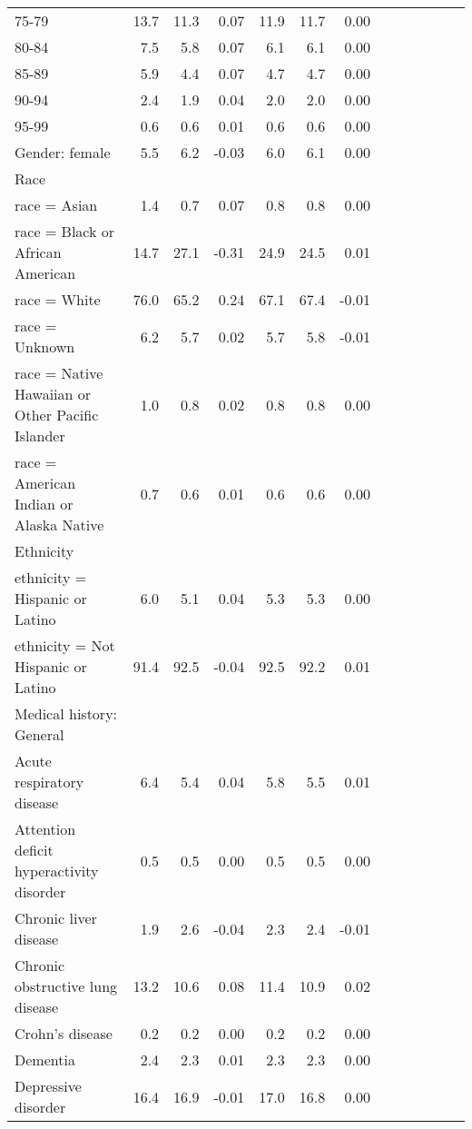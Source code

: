 \documentclass[11pt,]{article}
\begin{document}
\begin{longtable}{lrrrrrrrrrrrr}
      75-79 & 13.7 & 11.3 &  0.07 & 11.9 & 11.7 &  0.00 \\ 
      80-84 &  7.5 &  5.8 &  0.07 &  6.1 &  6.1 &  0.00 \\ 
      85-89 &  5.9 &  4.4 &  0.07 &  4.7 &  4.7 &  0.00 \\ 
      90-94 &  2.4 &  1.9 &  0.04 &  2.0 &  2.0 &  0.00 \\ 
      95-99 &  0.6 &  0.6 &  0.01 &  0.6 &  0.6 &  0.00 \\ 
  Gender: female &  5.5 &  6.2 & -0.03 &  6.0 &  6.1 &  0.00 \\ 
  Race &    &    &     &    &    &     \\ 
      race = Asian &  1.4 &  0.7 &  0.07 &  0.8 &  0.8 &  0.00 \\ 
      race = Black or African American & 14.7 & 27.1 & -0.31 & 24.9 & 24.5 &  0.01 \\ 
      race = White & 76.0 & 65.2 &  0.24 & 67.1 & 67.4 & -0.01 \\ 
      race = Unknown &  6.2 &  5.7 &  0.02 &  5.7 &  5.8 & -0.01 \\ 
      race = Native Hawaiian or Other Pacific Islander &  1.0 &  0.8 &  0.02 &  0.8 &  0.8 &  0.00 \\ 
      race = American Indian or Alaska Native &  0.7 &  0.6 &  0.01 &  0.6 &  0.6 &  0.00 \\ 
  Ethnicity &    &    &     &    &    &     \\ 
      ethnicity = Hispanic or Latino &  6.0 &  5.1 &  0.04 &  5.3 &  5.3 &  0.00 \\ 
      ethnicity = Not Hispanic or Latino & 91.4 & 92.5 & -0.04 & 92.5 & 92.2 &  0.01 \\ 
  Medical history: General &    &    &     &    &    &     \\ 
      Acute respiratory disease &  6.4 &  5.4 &  0.04 &  5.8 &  5.5 &  0.01 \\ 
      Attention deficit hyperactivity disorder &  0.5 &  0.5 &  0.00 &  0.5 &  0.5 &  0.00 \\ 
      Chronic liver disease &  1.9 &  2.6 & -0.04 &  2.3 &  2.4 & -0.01 \\ 
      Chronic obstructive lung disease & 13.2 & 10.6 &  0.08 & 11.4 & 10.9 &  0.02 \\ 
      Crohn's disease &  0.2 &  0.2 &  0.00 &  0.2 &  0.2 &  0.00 \\ 
      Dementia &  2.4 &  2.3 &  0.01 &  2.3 &  2.3 &  0.00 \\ 
      Depressive disorder & 16.4 & 16.9 & -0.01 & 17.0 & 16.8 &  0.00 \\ 

\end{longtable}
\end{document}
